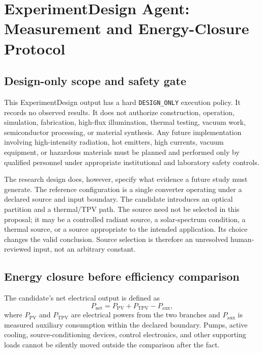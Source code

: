 \documentclass[conference]{../../../../Conference-LaTeX-template_10-17-19/IEEEtran}
\newcommand{\pnet}{P_{\mathrm{net}}}
\begin{document}
\section{ExperimentDesign Agent: Measurement and Energy-Closure Protocol}
\subsection{Design-only scope and safety gate}
This ExperimentDesign output has a hard \texttt{DESIGN\_ONLY} execution policy. It records no observed results. It does not authorize construction, operation, simulation, fabrication, high-flux illumination, thermal testing, vacuum work, semiconductor processing, or material synthesis. Any future implementation involving high-intensity radiation, hot emitters, high currents, vacuum equipment, or hazardous materials must be planned and performed only by qualified personnel under appropriate institutional and laboratory safety controls.

The research design does, however, specify what evidence a future study must generate. The reference configuration is a single converter operating under a declared source and input boundary. The candidate introduces an optical partition and a thermal/TPV path. The source need not be selected in this proposal; it may be a controlled radiant source, a solar-spectrum condition, a thermal source, or a source appropriate to the intended application. Its choice changes the valid conclusion. Source selection is therefore an unresolved human-reviewed input, not an arbitrary constant.

\subsection{Energy closure before efficiency comparison}
The candidate's net electrical output is defined as
\begin{equation}
\pnet=P_{\mathrm{PV}}+P_{\mathrm{TPV}}-P_{\mathrm{aux}},
\label{eq:net-power}
\end{equation}
where $P_{\mathrm{PV}}$ and $P_{\mathrm{TPV}}$ are electrical powers from the two branches and $P_{\mathrm{aux}}$ is measured auxiliary consumption within the declared boundary. Pumps, active cooling, source-conditioning devices, control electronics, and other supporting loads cannot be silently moved outside the comparison after the fact.
\end{document}
